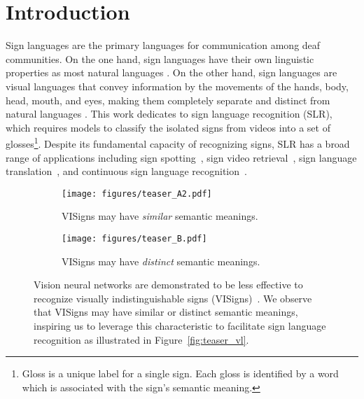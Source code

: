 \documentclass[10pt,twocolumn,letterpaper]{article}
\begin{document}
\section{Introduction}
\label{sec:intro}
Sign languages are the primary languages for communication among deaf communities. On the one hand, sign languages have their own linguistic properties as most natural languages \cite{sandler2006sign, adaloglou2021comprehensive, yin2022mlslt}. On the other hand, sign languages are visual languages that convey information by the movements of the hands, body, head, mouth, and eyes, making them completely separate and distinct from natural languages \cite{stmc, zuo2022c2slr, chen2022simple}. This work dedicates to sign language recognition (SLR), which requires models to classify the isolated signs from videos into a set of glosses\footnote{Gloss is a unique label for a single sign. Each gloss is identified by a word which is associated with the sign’s semantic meaning.}. Despite its fundamental capacity of recognizing signs, SLR has a broad range of applications including sign spotting~\cite{varol2022scaling, momeni2022automatic, li2020transferring}, sign video retrieval~\cite{duarte2022sign}, sign language translation~\cite{li2020tspnet, shi2022open, chen2022simple}, and continuous sign language recognition~\cite{chen2022simple, adaloglou2021comprehensive}.

\begin{figure}
     \centering
     \begin{subfigure}[b]{0.45\textwidth}
         \centering
         \texttt{[image: figures/teaser\_A2.pdf]}
         \caption{VISigns may have \textit{similar} semantic meanings.}
         \label{fig:teaser_A}
     \end{subfigure}
     \hfill
     \begin{subfigure}[b]{0.45\textwidth}
         \centering
         \texttt{[image: figures/teaser\_B.pdf]}
         \caption{VISigns may have \textit{distinct} semantic meanings.}
         \label{fig:teaser_B}
     \end{subfigure}
\vspace{-2mm}
    \caption{Vision neural networks are demonstrated to be less effective to recognize visually indistinguishable signs (VISigns)~\cite{albanie2020bsl, li2020word, joze2019ms}. We observe that VISigns may have similar or distinct semantic meanings, inspiring us to leverage this characteristic to facilitate sign language recognition as illustrated in Figure~\ref{fig:teaser_vl}.}
    \vspace{-6mm}
    \label{fig:teaser}
\end{figure}
\end{document}
